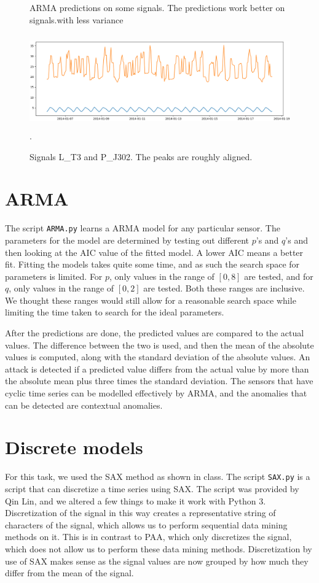 \documentclass[]{article}
\begin{document}
\begin{figure}[H]
\begin{minipage}{.5\textwidth}
   \caption{ARMA predictions on some signals. The predictions work better on signals.with less variance}
  \label{predictions}
\end{minipage}
\begin{minipage}{.5\textwidth}
  \includegraphics[width=2\linewidth, height=4cm]{./visuallizations/correlated_signals.png}.
  \label{correlation}
  \caption{Signals L\_T3 and P\_J302. The peaks are roughly aligned.}
\end{minipage}%
\end{figure}
\clearpage
\section{ARMA}
The script \texttt{ARMA.py} learns a ARMA model for any particular sensor. The parameters for the model are determined by testing out different $p$'s and $q$'s and then looking at the AIC value of the fitted model. A lower AIC means a better fit. Fitting the models takes quite some time, and as such the search space for parameters is limited. For $p$, only values in the range of $[0, 8]$ are tested, and for $q$, only values in the range of $[0, 2]$ are tested. Both these ranges are inclusive. We thought these ranges would still allow for a reasonable search space while limiting the time taken to search for the ideal parameters.

After the predictions are done, the predicted values are compared to the actual values. The difference between the two is used, and then the mean of the absolute values is computed, along with the standard deviation of the absolute values. An attack is detected if a predicted value differs from the actual value by more than the absolute mean plus three times the standard deviation. The sensors that have cyclic time series can be modelled effectively by ARMA, and the anomalies that can be detected are contextual anomalies.
\section{Discrete models}
For this task, we used the SAX method as shown in class. The script \texttt{SAX.py} is a script that can discretize a time series using SAX. The script was provided by Qin Lin, and we altered a few things to make it work with Python 3. Discretization of the signal in this way creates a representative string of characters of the signal, which allows us to perform sequential data mining methods on it. This is in contrast to PAA, which only discretizes the signal, which does not allow us to perform these data mining methods. Discretization by use of SAX makes sense as the signal values are now grouped by how much they differ from the mean of the signal.
\end{document}
